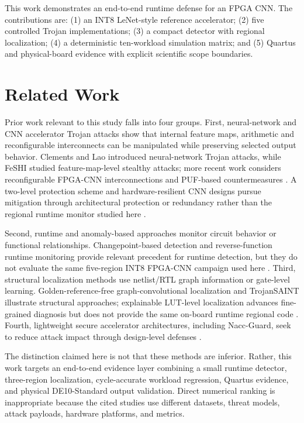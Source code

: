\documentclass[conference]{IEEEtran}
\begin{document}
This work demonstrates an end-to-end runtime defense for an FPGA CNN. The contributions are: (1) an INT8 LeNet-style reference accelerator; (2) five controlled Trojan implementations; (3) a compact detector with regional localization; (4) a deterministic ten-workload simulation matrix; and (5) Quartus and physical-board evidence with explicit scientific scope boundaries.

\section{Related Work}
Prior work relevant to this study falls into four groups. First, neural-network and CNN accelerator Trojan attacks show that internal feature maps, arithmetic and reconfigurable interconnects can be manipulated while preserving selected output behavior. Clements and Lao introduced neural-network Trojan attacks, while FeSHI studied feature-map-level stealthy attacks; more recent work considers reconfigurable FPGA-CNN interconnections and PUF-based countermeasures \cite{clements2018hardware,odetola2021feshi,hou2024interconnect}. A two-level protection scheme and hardware-resilient CNN designs pursue mitigation through architectural protection or redundancy rather than the regional runtime monitor studied here \cite{liu2024twolevel,sun2022resilient,sun2025resilient}.

Second, runtime and anomaly-based approaches monitor circuit behavior or functional relationships. Changepoint-based detection and reverse-function runtime monitoring provide relevant precedent for runtime detection, but they do not evaluate the same five-region INT8 FPGA-CNN campaign used here \cite{elnaggar2019changepoint,mohd2021rmvrf}. Third, structural localization methods use netlist/RTL graph information or gate-level learning. Golden-reference-free graph-convolutional localization and TrojanSAINT illustrate structural approaches; explainable LUT-level localization advances fine-grained diagnosis but does not provide the same on-board runtime regional code \cite{yasaei2022localization,lashen2023trojansa,su2025lutlocalization}. Fourth, lightweight secure accelerator architectures, including Nacc-Guard, seek to reduce attack impact through design-level defenses \cite{li2023naccguard}.

The distinction claimed here is not that these methods are inferior. Rather, this work targets an end-to-end evidence layer combining a small runtime detector, three-region localization, cycle-accurate workload regression, Quartus evidence, and physical DE10-Standard output validation. Direct numerical ranking is inappropriate because the cited studies use different datasets, threat models, attack payloads, hardware platforms, and metrics.
\end{document}

